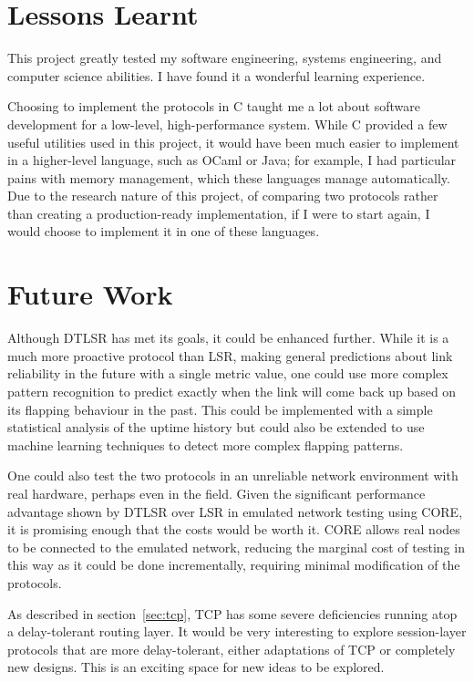 \documentclass[withindex,glossary,openany]{cam-thesis}
\begin{document}
\section{Lessons Learnt}

This project greatly tested my software engineering, systems engineering, and computer science abilities. I have found it a wonderful learning experience.

Choosing to implement the protocols in C taught me a lot about software development for a low-level, high-performance system. While C provided a few useful utilities used in this project, it would have been much easier to implement in a higher-level language, such as OCaml or Java; for example, I had particular pains with memory management, which these languages manage automatically. Due to the research nature of this project, of comparing two protocols rather than creating a production-ready implementation, if I were to start again, I would choose to implement it in one of these languages.

\section{Future Work}

Although DTLSR has met its goals, it could be enhanced further. While it is a much more proactive protocol than LSR, making general predictions about link reliability in the future with a single metric value, one could use more complex pattern recognition to predict exactly when the link will come back up based on its flapping behaviour in the past. This could be implemented with a simple statistical analysis of the uptime history but could also be extended to use machine learning techniques to detect more complex flapping patterns.

One could also test the two protocols in an unreliable network environment with real hardware, perhaps even in the field. Given the significant performance advantage shown by DTLSR over LSR in emulated network testing using CORE, it is promising enough that the costs would be worth it. CORE allows real nodes to be connected to the emulated network, reducing the marginal cost of testing in this way as it could be done incrementally, requiring minimal modification of the protocols.

As described in section~\ref{sec:tcp}, TCP has some severe deficiencies running atop a delay-tolerant routing layer. It would be very interesting to explore session-layer protocols that are more delay-tolerant, either adaptations of TCP or completely new designs. This is an exciting space for new ideas to be explored.
\end{document}
